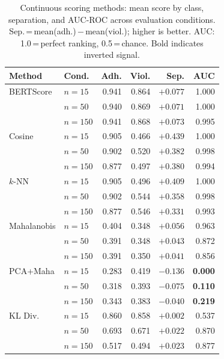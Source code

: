 \documentclass[11pt,a4paper]{article}
\begin{document}
\begin{table}[ht]
  \centering
  \small
  \caption{Continuous scoring methods: mean score by class, separation, and
           AUC-ROC across evaluation conditions. Sep.\,=\,mean(adh.)\,$-$\,mean(viol.);
           higher is better. AUC: 1.0\,=\,perfect ranking, 0.5\,=\,chance.
           Bold indicates inverted signal.}
  \label{tab:cont_results}
  \begin{tabular}{llrrrr}
    \toprule
    \textbf{Method} & \textbf{Cond.} &
    \textbf{Adh.} & \textbf{Viol.} & \textbf{Sep.} & \textbf{AUC} \\
    \midrule
    BERTScore     & $n=15$  & 0.941 & 0.864 & $+0.077$ & 1.000 \\
                  & $n=50$  & 0.940 & 0.869 & $+0.071$ & 1.000 \\
                  & $n=150$ & 0.941 & 0.868 & $+0.073$ & 0.995 \\
    \addlinespace[3pt]
    Cosine        & $n=15$  & 0.905 & 0.466 & $+0.439$ & 1.000 \\
                  & $n=50$  & 0.902 & 0.520 & $+0.382$ & 0.998 \\
                  & $n=150$ & 0.877 & 0.497 & $+0.380$ & 0.994 \\
    \addlinespace[3pt]
    $k$-NN        & $n=15$  & 0.905 & 0.496 & $+0.409$ & 1.000 \\
                  & $n=50$  & 0.902 & 0.544 & $+0.358$ & 0.998 \\
                  & $n=150$ & 0.877 & 0.546 & $+0.331$ & 0.993 \\
    \addlinespace[3pt]
    Mahalanobis   & $n=15$  & 0.404 & 0.348 & $+0.056$ & 0.963 \\
                  & $n=50$  & 0.391 & 0.348 & $+0.043$ & 0.872 \\
                  & $n=150$ & 0.391 & 0.350 & $+0.041$ & 0.856 \\
    \addlinespace[3pt]
    PCA+Maha      & $n=15$  & 0.283 & 0.419 & $\mathbf{-0.136}$ & \textbf{0.000} \\
                  & $n=50$  & 0.318 & 0.393 & $\mathbf{-0.075}$ & \textbf{0.110} \\
                  & $n=150$ & 0.343 & 0.383 & $\mathbf{-0.040}$ & \textbf{0.219} \\
    \addlinespace[3pt]
    KL Div.       & $n=15$  & 0.860 & 0.858 & $+0.002$ & 0.537 \\
                  & $n=50$  & 0.693 & 0.671 & $+0.022$ & 0.870 \\
                  & $n=150$ & 0.517 & 0.494 & $+0.023$ & 0.877 \\
    \bottomrule
  \end{tabular}
\end{table}
\end{document}
